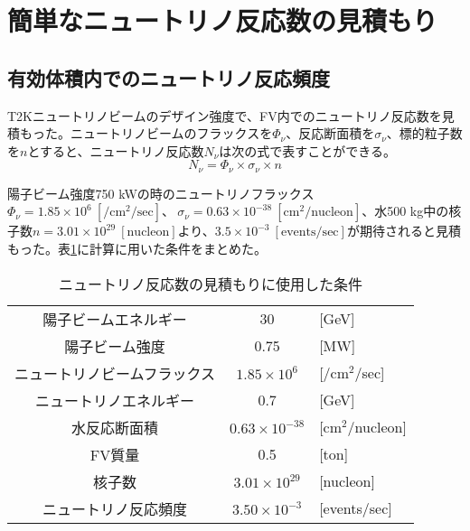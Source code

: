 \documentclass[11pt]{jreport}
\newcommand{\cmcm}{cm$^{2}$}
\newcommand{\tabref}[1]{表\ref{#1}}
\begin{document}
\section{簡単なニュートリノ反応数の見積もり}

\subsection{有効体積内でのニュートリノ反応頻度}
T2Kニュートリノビームのデザイン強度で、FV内でのニュートリノ反応数を見積もった。ニュートリノビームのフラックスを$\Phi_{\nu}$、反応断面積を$\sigma_{\nu}$、標的粒子数を$n$とすると、ニュートリノ反応数$N_{\nu}$は次の式で表すことができる。
\begin{equation}
N_{\nu}  = \Phi_{\nu} \times \sigma_{\nu} \times n
\end{equation}

陽子ビーム強度750 kWの時のニュートリノフラックス$\Phi_{\nu}=1.85 \times 10^{6}\ \mathrm{[/cm^{2}/sec]}$、$\ \sigma_{\nu}=0.63 \times 10^{-38}\ \mathrm{[cm^{2}/nucleon]}$、水500 kg中の核子数$n=3.01\times10^{29}\ \mathrm{[nucleon]}$より、$3.5\times10^{-3}\ \mathrm{[events/sec]}$が期待されると見積もった。\tabref{EventRateEstimation}に計算に用いた条件をまとめた。

\begin{table}[htbp]
\caption{ニュートリノ反応数の見積もりに使用した条件}
\begin{center}
\begin{tabular}{ccl}
\hline \hline
陽子ビームエネルギー & 30 & [GeV]\\
陽子ビーム強度 & 0.75 &[MW] \\
ニュートリノビームフラックス & $1.85 \times 10^{6}$ & [/\cmcm /sec] \\
ニュートリノエネルギー & 0.7 & [GeV]\\
水反応断面積 & $0.63 \times 10^{-38}$ & [\cmcm/nucleon]\\
FV質量 & 0.5 & [ton] \\
核子数 & $3.01\times10^{29}$ & [nucleon]\\
\hline
ニュートリノ反応頻度 & $3.50 \times 10^{-3}$ & [events/sec]\\
\hline \hline
\end{tabular}
\end{center}
\label{EventRateEstimation}
\end{table}%
\end{document}
